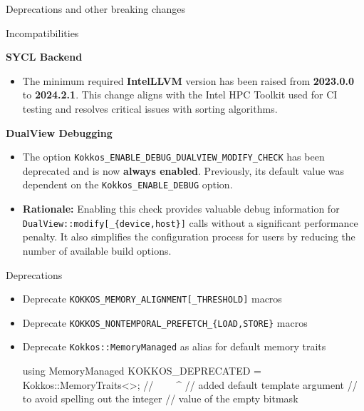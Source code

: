 
\begin{frame}[fragile]

  {\Huge Deprecations and other breaking changes}

  \vspace{10pt}

\end{frame}


\begin{frame}[fragile]{Incompatibilities}

  \textbf{SYCL Backend}
  \begin{itemize}
      \item The minimum required \textbf{IntelLLVM} version has been raised from \textbf{2023.0.0} to \textbf{2024.2.1}.
      This change aligns with the Intel HPC Toolkit used for CI testing and
      resolves critical issues with sorting algorithms.
  \end{itemize}
  \textbf{DualView Debugging}
  \begin{itemize}
    \item The option \texttt{Kokkos\_ENABLE\_DEBUG\_DUALVIEW\_MODIFY\_CHECK} has
        been deprecated and is now \textbf{always enabled}. Previously, its default
        value was dependent on the \texttt{Kokkos\_ENABLE\_DEBUG} option.
    \item \textbf{Rationale:} Enabling this check provides valuable debug information
        for \texttt{DualView::modify[\_\{device,host\}]} calls without a
        significant performance penalty. It also simplifies the configuration
        process for users by reducing the number of available build options.
  \end{itemize}
\end{frame}


\begin{frame}[fragile]{Deprecations}
  \begin{itemize}
    \item Deprecate \texttt{KOKKOS\_MEMORY\_ALIGNMENT[\_THRESHOLD]} macros
    \item Deprecate \texttt{KOKKOS\_NONTEMPORAL\_PREFETCH\_\{LOAD,STORE\}} macros
    \item Deprecate \texttt{Kokkos::MemoryManaged} as alias for default memory traits
\begin{code}[keywords={MemoryManaged}]
using MemoryManaged KOKKOS_DEPRECATED = Kokkos::MemoryTraits<>;
//                                      ^^^^^^^^^^^^^^^^^^^^^^
//                                      added default template argument
//                                      to avoid spelling out the integer
//                                      value of the empty bitmask
\end{code}
  \end{itemize}
\end{frame}
